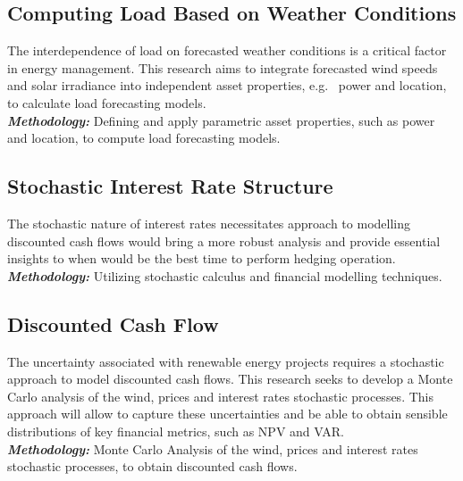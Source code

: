 \subsection{Computing Load Based on Weather Conditions}
    \label{subsec:forecasting-load-based-on-weather-conditions}

    The interdependence of load on forecasted weather conditions is a critical factor in energy management.
    This research aims to integrate forecasted wind speeds and solar irradiance into independent asset properties,
    e.g. \ power and location, to calculate load forecasting models.\\

\textbf{\textit{Methodology: }} Defining and apply parametric asset properties, such as power and location,
    to compute load forecasting models.

\subsection{Stochastic Interest Rate Structure}
    \label{subsec:rs_stochastic-interest-rate-structure}

    The stochastic nature of interest rates necessitates approach to modelling discounted cash flows would bring a
    more robust analysis and provide essential insights to when would be the best time to perform hedging operation.\\

    \textbf{\textit{Methodology: }} Utilizing stochastic calculus
    and financial modelling techniques\cite{filipovic_term-structure_2009}.

\subsection{Discounted Cash Flow}
    \label{subsec:rs_stochastic-process-for-discounted-cash-flow}

    The uncertainty associated with renewable energy projects requires a
    stochastic approach to model discounted cash flows.
    This research seeks to develop a Monte Carlo analysis of the wind, prices and interest rates stochastic processes.
    This approach will allow to capture these uncertainties and be able to obtain sensible
    distributions of key financial metrics, such as NPV and VAR.\\

    \textbf{\textit{Methodology: }} Monte Carlo Analysis of the wind,
    prices and interest rates stochastic processes, to obtain discounted cash flows.


